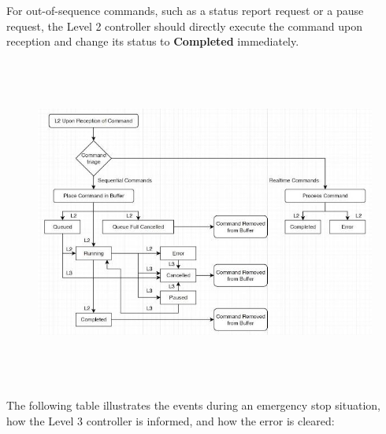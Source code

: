 \documentclass[11pt]{book}
\begin{document}
For out-of-sequence commands, such as a status report request or a pause request, the Level 2 controller should directly execute the command upon reception and change its status to \textbf{Completed }immediately.

\begin{figure}[H]
\includegraphics[width=15.92cm,height=10.87cm]{./images/image66.jpeg}
\end{figure}


The following table illustrates the events during an emergency stop situation, how the Level 3 controller is informed, and how the error is cleared:
\end{document}
